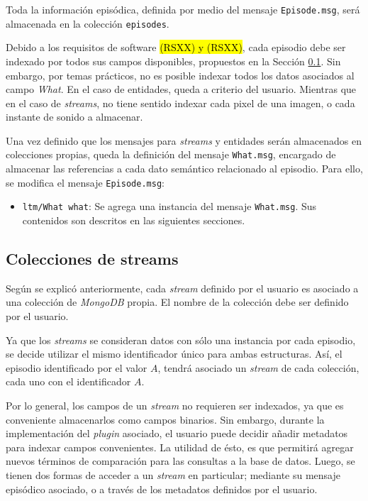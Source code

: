 Toda la información episódica, definida por medio del mensaje \texttt{Episode.msg}, será almacenada en la colección \texttt{episodes}.

Debido a los requisitos de software \hl{(RSXX) y (RSXX)}, cada episodio debe ser indexado por todos sus campos disponibles, propuestos en la Sección \ref{}. Sin embargo, por temas prácticos, no es posible indexar todos los datos asociados al campo \textit{What}. En el caso de entidades, queda a criterio del usuario. Mientras que en el caso de \textit{streams}, no tiene sentido indexar cada pixel de una imagen, o cada instante de sonido a almacenar.




Una vez definido que los mensajes para \textit{streams} y entidades serán almacenados en colecciones propias, queda la definición del mensaje \texttt{What.msg}, encargado de almacenar las referencias a cada dato semántico relacionado al episodio. Para ello, se modifica el mensaje \texttt{Episode.msg}:
\begin{itemize}
	\item \texttt{ltm/What what}: Se agrega una instancia del mensaje \texttt{What.msg}. Sus contenidos son descritos en las siguientes secciones.
\end{itemize}



\subsection{Colecciones de streams}

Según se explicó anteriormente, cada \textit{stream} definido por el usuario es asociado a una colección de \textit{MongoDB} propia. El nombre de la colección debe ser definido por el usuario. 

Ya que los \textit{streams} se consideran datos con sólo una instancia por cada episodio, se decide utilizar el mismo identificador único para ambas estructuras. Así, el episodio identificado por el valor $A$, tendrá asociado un \textit{stream} de cada colección, cada uno con el identificador $A$.


Por lo general, los campos de un \textit{stream} no requieren ser indexados, ya que es conveniente almacenarlos como campos binarios. Sin embargo, durante la implementación del \textit{plugin} asociado, el usuario puede decidir añadir metadatos para indexar campos convenientes. La utilidad de ésto, es que permitirá agregar nuevos términos de comparación para las consultas a la base de datos. Luego, se tienen dos formas de acceder a un \textit{stream} en particular; mediante su mensaje episódico asociado, o a través de los metadatos definidos por el usuario.


